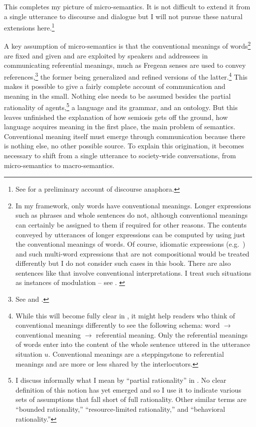 This completes my picture of micro-semantics. It is not difficult to extend it from a single utterance to discourse and dialogue but I will not pursue these natural extensions here.\footnote{See \citet{cp:ga} for a preliminary account of discourse anaphora.}

A key assumption of micro-semantics is that the conventional meanings of words{\footnote{In my framework, only words have conventional meanings. Longer expressions such as phrases and whole sentences do not, although conventional meanings can certainly be assigned to them if required for other reasons. The contents conveyed by utterances of longer expressions can be computed by using just the conventional meanings of words. Of course, idiomatic expressions (e.g.\ ) and such multi-word expressions that are not compositional would be treated differently but I do not consider such cases in this book. There are also sentences like  that involve conventional interpretations. I treat such situations as instances of modulation -- see . \label{foot:conventional meanings}}} are fixed and given and are exploited by speakers and addressees in communicating referential meanings, much as Fregean senses are used to convey references,\footnote{See \citet{frege:sr} and .} the former being generalized and refined versions of the latter.\footnote{While this will become fully clear in , it might help readers who think of conventional meanings differently to see the following schema: word $\longrightarrow$ conventional meaning $\longrightarrow$\hspace{-1.1em}\raisebox{1ex}{\scriptsize $u$}\hspace{.55em} referential meaning. Only the referential meanings of words enter into the content of the whole sentence uttered in the utterance situation $u$. Conventional meanings are a steppingstone to referential meanings and are more or less shared by the interlocutors.} This makes it possible to give a fairly complete account of communication and meaning in the small. Nothing else needs to be assumed besides the partial rationality of agents,\footnote{I discuss informally what I mean by ``partial rationality'' in . No clear definition of this notion has yet emerged and so I use it to indicate various sets of assumptions that fall short of full rationality. Other similar terms are ``bounded rationality,'' ``resource-limited rationality,'' and ``behavioral rationality.''} a language and its grammar, and an ontology. But this leaves unfinished the explanation of how semiosis gets off the ground, how language acquires meaning in the first place, the main problem of semantics. Conventional meaning itself must emerge through communication because there is nothing else, no other possible source. To explain this origination, it becomes necessary to shift from a single utterance to society-wide conversations, from micro-semantics to macro-semantics.

